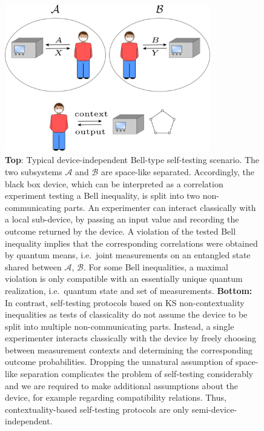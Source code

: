 \begin{figure}
    \centering
    \includegraphics[width=0.8\textwidth]{images/self-testing.png}
    \caption{\textbf{Top}: Typical device-independent Bell-type self-testing scenario. The two subsystems $\mathcal{A}$ and $\mathcal{B}$ are space-like separated. Accordingly, the black box device, which can be interpreted as a correlation experiment testing a Bell inequality, is split into two non-communicating parts. An experimenter can interact classically with a local sub-device, by passing an input value and recording the outcome returned by the device. A violation of the tested Bell inequality implies that the corresponding correlations were obtained by quantum means, i.e.\ joint measurements on an entangled state shared between $\mathcal{A}$, $\mathcal{B}$. For some Bell inequalities, a maximal violation is only compatible with an essentially unique quantum realization, i.e.\ quantum state and set of measurements.
    \textbf{Bottom:} In contrast, self-testing protocols based on KS non-contextuality inequalities as tests of classicality do not assume the device to be split into multiple non-communicating parts. Instead, a single experimenter interacts classically with the device by freely choosing between measurement contexts and determining the corresponding outcome probabilities. Dropping the unnatural assumption of space-like separation complicates the problem of self-testing considerably and we are required to make additional assumptions about the device, for example regarding compatibility relations. Thus, contextuality-based self-testing protocols are only semi-device-independent.}
    \label{fig:selftesting}
\end{figure}
